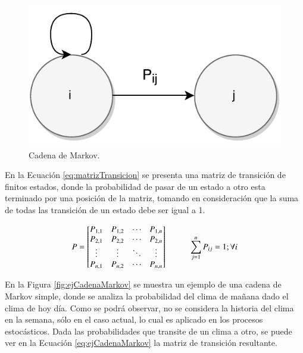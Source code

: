 \begin{figure}[ht!]
  \centering
    \includegraphics[scale=0.6]{images/CadenaMarkov.pdf}
  \caption{Cadena de Markov.}
  \label{fig:cadenaMarkov}
\end{figure}

En la Ecuación \ref{eq:matrizTransicion} se presenta una matriz de transición de finitos estados, donde la probabilidad de pasar de un estado a otro esta terminado por una posición de la matriz, tomando en consideración que la suma de todas las transición de un estado debe ser igual a 1.

\begin{equation} \label{eq:matrizTransicion}
	P =
	\begin{bmatrix}
		P_{1,1} & P_{1,2} & \cdots & P_{1,n} \\
		P_{2,1} & P_{2,2} & \cdots & P_{2,n} \\
		\vdots  & \vdots  & \ddots & \vdots  \\
		P_{n,1} & P_{n,2} & \cdots & P_{n,n} \\
	\end{bmatrix}
	\hspace*{1cm} \sum_{j=1}^{n} P_{ij} = 1 ; \forall i
\end{equation}

En la Figura \ref{fig:ejCadenaMarkov} se muestra un ejemplo de una cadena de Markov simple, donde se analiza la probabilidad del clima de mañana dado el clima de hoy día. Como se podrá observar, no se considera la historia del clima en la semana, sólo en el caso actual, lo cual es aplicado en los procesos estocásticos. Dada las probabilidades que transite de un clima a otro, se puede ver en la Ecuación \ref{eq:ejCadenaMarkov} la matriz de transición resultante.

